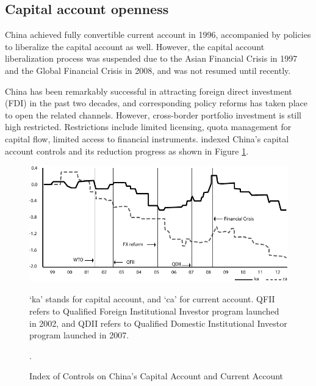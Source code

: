 \documentclass[AER]{AEA}
\begin{document}


\subsection{Capital account openness}

China achieved fully convertible current account in 1996, accompanied by
policies to liberalize the capital account as well. However, the capital account
liberalization process was suspended due to the Asian Financial Crisis in 1997
and the Global Financial Crisis in 2008, and was not resumed until recently. 

China has been remarkably successful in attracting foreign direct investment
(FDI) in the past two decades, and corresponding policy reforms has taken
place to open the related channels. 
However, cross-border portfolio investment is still high restricted. 
Restrictions include limited licensing, quota management for capital flow, 
limited access to financial instruments.
\cite{chen2015} indexed China's capital account controls and its reduction
progress as shown in Figure \ref{fig:capacc}. 

\begin{figure}[!htb]
\centering
\includegraphics[scale=.9]{fig/capacc.pdf}
\caption{Index of Controls on China's Capital Account and Current Account}
\begin{figurenotes}
`ka' stands for capital account, and `ca' for current account. QFII refers to
Qualified Foreign Institutional Investor program launched in 2002, and QDII
refers to Qualified Domestic Institutional Investor program launched in 2007.
\end{figurenotes}
\begin{figurenotes}[Source]
\cite{chen2015}.
\end{figurenotes}
\label{fig:capacc}
\end{figure}
\end{document}
